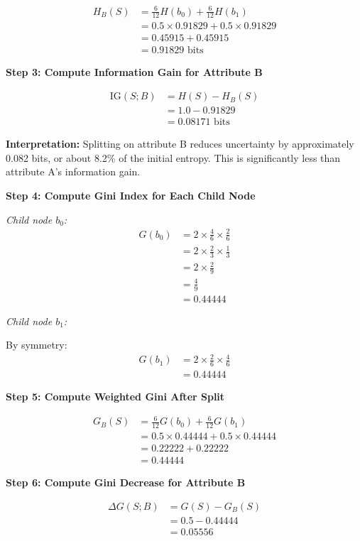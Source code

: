 \documentclass[12pt]{article}
\begin{document}
\begin{solution}
\begin{align*}
H_B(S) &= \frac{6}{12} H(b_0) + \frac{6}{12} H(b_1) \\
&= 0.5 \times 0.91829 + 0.5 \times 0.91829 \\
&= 0.45915 + 0.45915 \\
&= 0.91829 \text{ bits}
\end{align*}

\textbf{Step 3: Compute Information Gain for Attribute B}

\begin{align*}
\text{IG}(S; B) &= H(S) - H_B(S) \\
&= 1.0 - 0.91829 \\
&= 0.08171 \text{ bits}
\end{align*}

\textbf{Interpretation:} Splitting on attribute B reduces uncertainty by approximately 0.082 bits, or about 8.2\% of the initial entropy. This is significantly less than attribute A's information gain.

\textbf{Step 4: Compute Gini Index for Each Child Node}

\textit{Child node $b_0$:}
\begin{align*}
G(b_0) &= 2 \times \frac{4}{6} \times \frac{2}{6} \\
&= 2 \times \frac{2}{3} \times \frac{1}{3} \\
&= 2 \times \frac{2}{9} \\
&= \frac{4}{9} \\
&= 0.44444
\end{align*}

\textit{Child node $b_1$:}

By symmetry:
\begin{align*}
G(b_1) &= 2 \times \frac{2}{6} \times \frac{4}{6} \\
&= 0.44444
\end{align*}

\textbf{Step 5: Compute Weighted Gini After Split}

\begin{align*}
G_B(S) &= \frac{6}{12} G(b_0) + \frac{6}{12} G(b_1) \\
&= 0.5 \times 0.44444 + 0.5 \times 0.44444 \\
&= 0.22222 + 0.22222 \\
&= 0.44444
\end{align*}

\textbf{Step 6: Compute Gini Decrease for Attribute B}

\begin{align*}
\Delta G(S; B) &= G(S) - G_B(S) \\
&= 0.5 - 0.44444 \\
&= 0.05556
\end{align*}


\end{solution}
\end{document}
